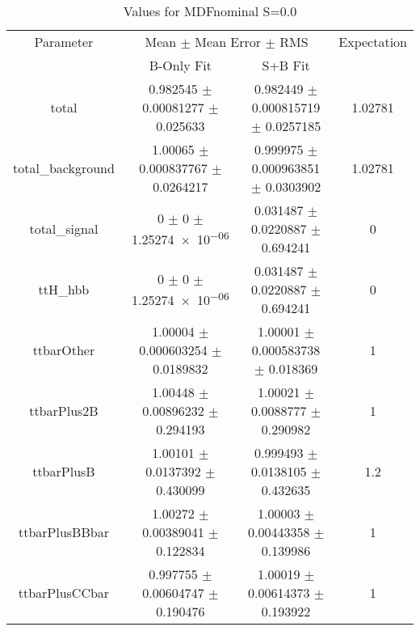 \begin{table}
\centering
\caption{Values for MDFnominal S=0.0}
\begin{tabular}{cccc}
\toprule
Parameter & \multicolumn{2}{c}{Mean $\pm$ Mean Error $\pm$ RMS} & Expectation\\
 & B-Only Fit & S+B Fit & \\
\midrule
total & \num{0.982545} $\pm$ \num{0.00081277} $\pm$ \num{0.025633} & \num{0.982449} $\pm$ \num{0.000815719} $\pm$ \num{0.0257185} & \num{1.02781}\\
total\_background & \num{1.00065} $\pm$ \num{0.000837767} $\pm$ \num{0.0264217} & \num{0.999975} $\pm$ \num{0.000963851} $\pm$ \num{0.0303902} & \num{1.02781}\\
total\_signal & \num{0} $\pm$ \num{0} $\pm$ \num{1.25274e-06} & \num{0.031487} $\pm$ \num{0.0220887} $\pm$ \num{0.694241} & \num{0}\\
ttH\_hbb & \num{0} $\pm$ \num{0} $\pm$ \num{1.25274e-06} & \num{0.031487} $\pm$ \num{0.0220887} $\pm$ \num{0.694241} & \num{0}\\
ttbarOther & \num{1.00004} $\pm$ \num{0.000603254} $\pm$ \num{0.0189832} & \num{1.00001} $\pm$ \num{0.000583738} $\pm$ \num{0.018369} & \num{1}\\
ttbarPlus2B & \num{1.00448} $\pm$ \num{0.00896232} $\pm$ \num{0.294193} & \num{1.00021} $\pm$ \num{0.0088777} $\pm$ \num{0.290982} & \num{1}\\
ttbarPlusB & \num{1.00101} $\pm$ \num{0.0137392} $\pm$ \num{0.430099} & \num{0.999493} $\pm$ \num{0.0138105} $\pm$ \num{0.432635} & \num{1.2}\\
ttbarPlusBBbar & \num{1.00272} $\pm$ \num{0.00389041} $\pm$ \num{0.122834} & \num{1.00003} $\pm$ \num{0.00443358} $\pm$ \num{0.139986} & \num{1}\\
ttbarPlusCCbar & \num{0.997755} $\pm$ \num{0.00604747} $\pm$ \num{0.190476} & \num{1.00019} $\pm$ \num{0.00614373} $\pm$ \num{0.193922} & \num{1}\\
\bottomrule
\end{tabular}
\end{table}